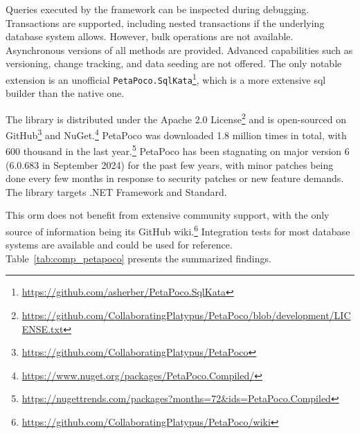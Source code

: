 Queries executed by the framework can be inspected during debugging. Transactions are supported, including nested transactions if the underlying database system allows. However, bulk operations are not available. Asynchronous versions of all methods are provided. Advanced capabilities such as versioning, change tracking, and data seeding are not offered. The only notable extension is an unofficial \texttt{PetaPoco.SqlKata}\footnote{\url{https://github.com/asherber/PetaPoco.SqlKata}}, which is a more extensive \acrshort{sql} builder than the native one.

The library is distributed under the Apache 2.0 License\footnote{\url{https://github.com/CollaboratingPlatypus/PetaPoco/blob/development/LICENSE.txt}} and is open-sourced on GitHub\footnote{\url{https://github.com/CollaboratingPlatypus/PetaPoco}} and NuGet.\footnote{\url{https://www.nuget.org/packages/PetaPoco.Compiled/}} PetaPoco was downloaded 1.8 million times in total, with 600 thousand in the last year.\footnote{\url{https://nugettrends.com/packages?months=72&ids=PetaPoco.Compiled}} PetaPoco has been stagnating on major version 6 (6.0.683 in September 2024) for the past few years, with minor patches being done every few months in response to security patches or new feature demands. The library targets .NET Framework and Standard.

This \acrshort{orm} does not benefit from extensive community support, with the only source of information being its GitHub wiki.\footnote{\url{https://github.com/CollaboratingPlatypus/PetaPoco/wiki}} Integration tests for most database systems are available and could be used for reference. Table~\ref{tab:comp_petapoco} presents the summarized findings.


